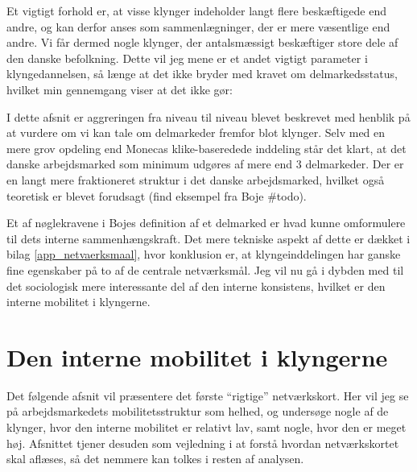 Et vigtigt forhold er, at visse klynger indeholder langt flere beskæftigede end andre, og kan derfor anses som sammenlægninger, der er mere væsentlige end andre. Vi får dermed nogle klynger, der antalsmæssigt beskæftiger store dele af den danske befolkning. Dette vil jeg mene er et andet vigtigt parameter i klyngedannelsen, så længe at det ikke bryder med kravet om delmarkedsstatus, hvilket min gennemgang viser at det ikke gør: 


I dette afsnit er aggreringen fra niveau til niveau blevet beskrevet med henblik på at vurdere om vi kan tale om delmarkeder fremfor blot klynger. Selv med en mere grov opdeling end Monecas klike-baseredede inddeling står det klart, at det danske arbejdsmarked som minimum udgøres af mere end 3 delmarkeder.  Der er en langt mere fraktioneret struktur i det danske arbejdsmarked, hvilket også teoretisk er blevet forudsagt (find eksempel fra Boje \#todo). 


Et af nøglekravene i Bojes definition af et delmarked er hvad kunne omformulere til dets interne sammenhængskraft. Det mere tekniske aspekt af dette er dækket i bilag \ref{app_netvaerksmaal}, hvor konklusion er, at klyngeinddelingen har ganske fine egenskaber på to af de centrale netværksmål. Jeg vil nu gå i dybden med til det sociologisk mere interessante del af den interne konsistens, hvilket er den interne mobilitet i klyngerne.





\section{Den interne mobilitet i klyngerne \label{analyse_deskriptivt_within_mob_seg}}


Det følgende afsnit vil præsentere det første “rigtige” netværkskort. Her vil jeg se på arbejdsmarkedets mobilitetsstruktur som helhed, og undersøge nogle af de klynger, hvor den interne mobilitet er relativt lav, samt nogle, hvor den er meget høj. Afsnittet tjener desuden som vejledning i at forstå hvordan netværkskortet skal aflæses, så det nemmere kan tolkes i resten af analysen.




